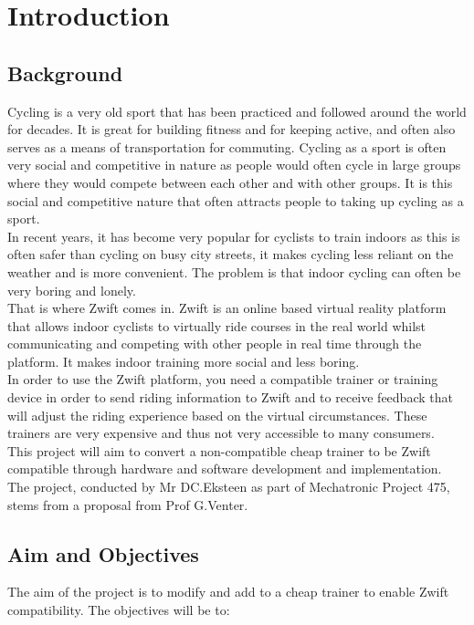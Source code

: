 \chapter{Introduction}
\section{Background}

Cycling is a very old sport that has been practiced and followed around the world for decades. It is great for building fitness and for keeping active, and often also serves as a means of transportation for commuting. Cycling as a sport is often very social and competitive in nature as people would often cycle in large groups where they would compete between each other and with other groups. It is this social and competitive nature that often attracts people to taking up cycling as a sport.\\
In recent years, it has become very popular for cyclists to train indoors as this is often safer than cycling on busy city streets, it makes cycling less reliant on the weather and is more convenient. The problem is that indoor cycling can often be very boring and lonely. \\
That is where Zwift comes in. Zwift is an online based virtual reality platform that allows indoor cyclists to virtually ride courses in the real world whilst communicating and competing with other people in real time through the platform. It makes indoor training more social and less boring.\\
In order to use the Zwift platform, you need a compatible trainer or training device in order to send riding information to Zwift and to receive feedback that will adjust the riding experience based on the virtual circumstances. These trainers are very expensive and thus not very accessible to many consumers.\\
This project will aim to convert a non-compatible cheap trainer to be Zwift compatible through hardware and software development and implementation. The project, conducted by Mr DC.Eksteen as part of Mechatronic Project 475, stems from a proposal from Prof G.Venter.

\section{Aim and Objectives}

The aim of the project is to modify and add to a cheap trainer to enable Zwift compatibility.
The objectives will be to: 

